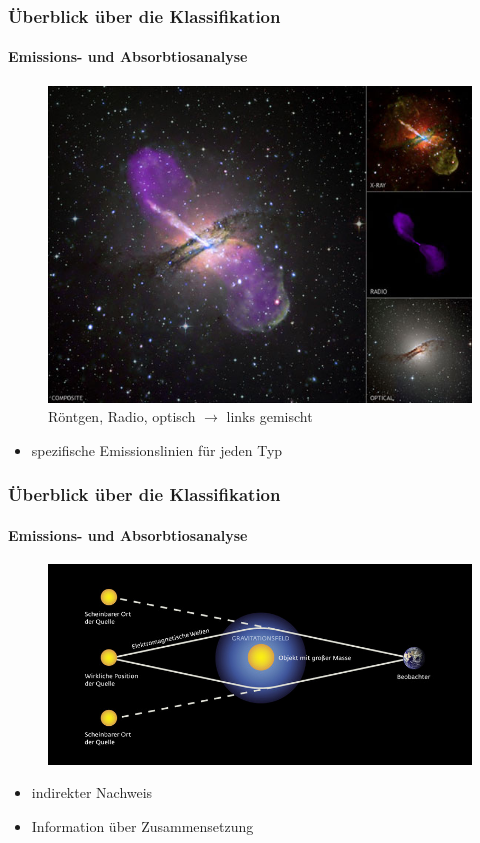 \begin{frame}
\frametitle{Überblick über die Klassifikation}
\framesubtitle{Emissions- und Absorbtiosanalyse}


\begin{figure}
\includegraphics[scale=0.35]{Radiogalaxie.jpg}
\caption{Röntgen, Radio, optisch $\rightarrow$ links gemischt}
\end{figure}

\begin{itemize}
\item spezifische Emissionslinien für jeden Typ
\end{itemize}

\end{frame}


\begin{frame}
\frametitle{Überblick über die Klassifikation}
\framesubtitle{Emissions- und Absorbtiosanalyse}

\begin{figure}
\includegraphics[scale=0.7]{Gravitationslinse.jpg}
\end{figure}

\begin{itemize}
\item indirekter Nachweis
\item Information über Zusammensetzung
\end{itemize}

\end{frame}


